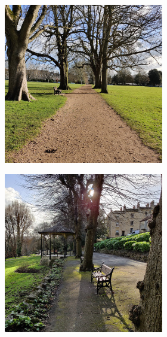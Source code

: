 \begin{figure}[p]
    \centering
    \begin{subfigure}[b]{\textwidth}
        \centering
        \begin{subfigure}[b]{0.32\textwidth}
            \centering
            \includegraphics[width=\textwidth]{content/3-Methods/enviroments/flat_1_modified.jpg}
        \end{subfigure}
        \hfill
        \begin{subfigure}[b]{0.32\textwidth}
            \centering
            \includegraphics[width=\textwidth]{content/3-Methods/enviroments/flat_2_modified.jpg}

\end{subfigure}
\end{subfigure}
\end{figure}
